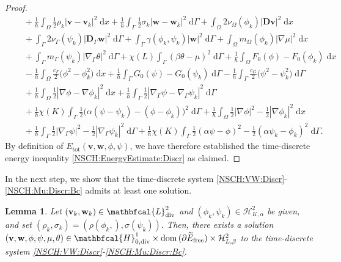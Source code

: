 \documentclass[11pt,reqno]{amsart}
\newtheorem{lemma}[theorem]{Lemma}
\theoremstyle{remark}
\numberwithin{equation}{section}
\newcommand{\abs}[1]{|#1|}
\newcommand{\intO}{\int_\Omega}
\newcommand{\intG}{\int_\Gamma}
\newcommand{\dx}{\;\mathrm{d}x}
\newcommand{\dG}{\;\mathrm d\Ga}
\newcommand{\Grad}{\nabla}
\newcommand{\Div}{\textnormal{div}}
\newcommand{\Gradg}{\nabla_\Ga}
\newcommand{\Om}{\Omega}
\newcommand{\Ga}{\Gamma}
\newcommand{\bv}{\mathbf v}
\newcommand{\bw}{\mathbf w}
\newcommand{\D}{\mathbf D}
\newcommand{\Dg}{\mathbf D_\Ga}
\newcommand{\free}{\mathrm{free}}
\begin{document}
\begin{proof}
\begin{align*}
        &\quad + \frac1h\intO \frac12 \rho_k\abs{\bv - \bv_k}^2\dx + \frac1h\intG \frac12\sigma_k\abs{\bw - \bw_k}^2\dG + \intO 2\nu_\Om(\phi_k)\abs{\D\bv}^2\dx \nonumber \\
        &\quad + \intG 2\nu_\Ga(\psi_k)\abs{\Dg\bw}^2\dG + \intG \gamma(\phi_k,\psi_k)\abs{\bw}^2\dG + \intO m_\Om(\phi_k)\abs{\Grad\mu}^2\dx \\
        &\quad + \intG m_\Ga(\psi_k)\abs{\Gradg\theta}^2\dG + \chi(L)\intG(\beta\theta - \mu)^2\dG + \frac1h\intO F_0(\phi) - F_0(\phi_k)\dx \nonumber \\
        &\quad - \frac1h\intO \frac{c_F}{2}\big(\phi^2 - \phi_k^2\big)\dx + \frac1h\intG G_0(\psi) - G_0(\psi_k)\dG - \frac1h\intG\frac{c_G}{2}\big(\psi^2 - \psi_k^2\big)\dG \nonumber \\
        &\quad + \frac1h \intO \frac12\abs{\Grad\phi - \Grad\phi_k}^2\dx + \frac1h\intG\frac12\abs{\Gradg\psi - \Gradg\psi_k}^2\dG \nonumber \\
        &\quad + \frac1h\chi(K)\intG\frac12\big(\alpha(\psi - \psi_k) - (\phi - \phi_k)\big)^2\dG + \frac1h\intO\frac12\abs{\Grad\phi}^2 - \frac12\abs{\Grad\phi_k}^2\dx \nonumber \\
        &\quad + \frac1h\intG\frac12\abs{\Gradg\psi}^2 - \frac12\abs{\Gradg\psi_k}^2\dG + \frac1h\chi(K)\intG\frac12(\alpha\psi - \phi)^2 - \frac12(\alpha\psi_k - \phi_k)^2\dG. \nonumber
    \end{align*}
    By definition of $E_{\mathrm{tot}}(\bv,\bw,\phi,\psi)$, we have therefore established the time-discrete energy inequality \eqref{NSCH:EnergyEstimate:Discr} as claimed.
\end{proof}

In the next step, we show that the time-discrete system \eqref{NSCH:VW:Discr}-\eqref{NSCH:Mu:Discr:Bc} admits at least one solution.

\begin{lemma}\label{NSCH:Lemma:Existence:Discrete}
    Let $(\bv_k,\bw_k)\in\mathbfcal{L}^2_\Div$ and $(\phi_k,\psi_k)\in\mathcal{H}^2_{K,\alpha}$ be given, and set $(\rho_k,\sigma_k) = (\rho(\phi_k,),\sigma(\psi_k))$. Then, there exists a solution $(\bv,\bw,\phi,\psi,\mu,\theta)\in\mathbfcal{H}^1_{0,\Div}\times\mathrm{dom}\,(\partial \widetilde E_\free)\times\mathcal{H}^2_{L,\beta}$ to the time-discrete system \eqref{NSCH:VW:Discr}-\eqref{NSCH:Mu:Discr:Bc}.
\end{lemma}
\end{document}
